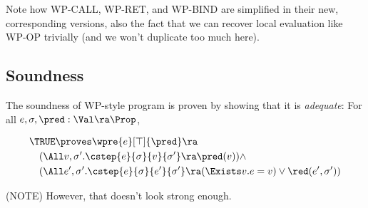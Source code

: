 Note how WP-CALL, WP-RET, and WP-BIND are simplified in their new, corresponding versions,
also the fact that we can recover local evaluation like WP-OP trivially
(and we won't duplicate too much here).

\subsection{Soundness}

The soundness of WP-style program is proven by showing that it is \emph{adequate}: For all $e, \sigma, \pred: \Val \ra \Prop$,

\begin{align*}
&\TRUE \proves \wpre{e}[\top]{\pred} \ra \\
&\quad (\All v, \sigma'. \cstep{e}{\sigma}{v}{\sigma'} \ra \pred(v)) \land \\
&\quad (\All e', \sigma'. \cstep{e}{\sigma}{e'}{\sigma'} \ra (\Exists v. e = v) \lor \red(e', \sigma'))
\end{align*}

(NOTE) However, that doesn't look strong enough.


